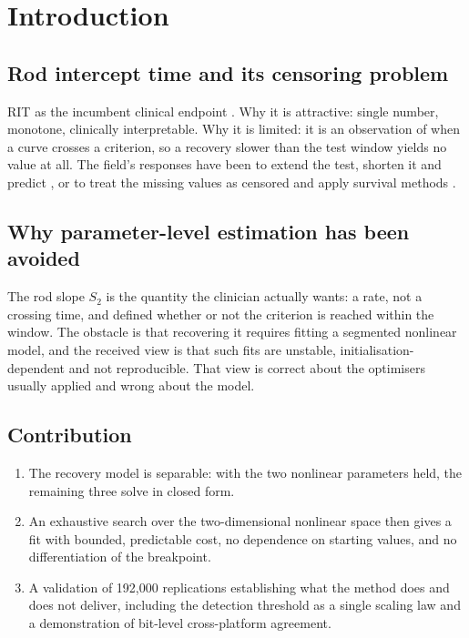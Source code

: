 \documentclass[11pt,a4paper]{article}
\newcommand{\Sii}{S_2}
\begin{document}
\section{Introduction}

\subsection{Rod intercept time and its censoring problem}
\begin{towrite}
RIT as the incumbent clinical endpoint \citep{Jackson:2014aa,Owsley:2016aa}.
Why it is attractive: single number, monotone, clinically interpretable.
Why it is limited: it is an observation of when a curve crosses a criterion,
so a recovery slower than the test window yields no value at all. The field's
responses have been to extend the test, shorten it and predict
\citep{Jackson:2008aa,DeSilva:2019aa}, or to treat the missing values as
censored and apply survival methods \citep{Higgins:2018aa}.
\end{towrite}

\subsection{Why parameter-level estimation has been avoided}
\begin{towrite}
The rod slope $\Sii$ is the quantity the clinician actually wants: a rate,
not a crossing time, and defined whether or not the criterion is reached
within the window. The obstacle is that recovering it requires fitting a
segmented nonlinear model, and the received view is that such fits are
unstable, initialisation-dependent and not reproducible. That view is
correct about the optimisers usually applied and wrong about the model.
\end{towrite}

\subsection{Contribution}
\begin{enumerate}[nosep]
\item The recovery model is separable: with the two nonlinear parameters
  held, the remaining three solve in closed form.
\item An exhaustive search over the two-dimensional nonlinear space then
  gives a fit with bounded, predictable cost, no dependence on starting
  values, and no differentiation of the breakpoint.
\item A validation of 192,000 replications establishing what the method
  does and does not deliver, including the detection threshold as a single
  scaling law and a demonstration of bit-level cross-platform agreement.
\end{enumerate}
\end{document}

